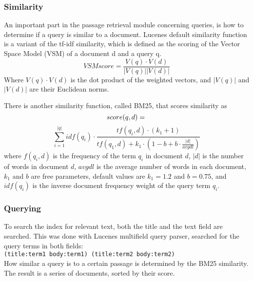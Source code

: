 \subsubsection{Similarity}
An important part in the passage retrieval module concerning queries, is how to determine if a query is similar to a document.
Lucenes default similarity function is a variant of the tf-idf similarity, 
which is defined as the scoring of the Vector Space Model (VSM) of a document d and a query q.
\[VSM score = \frac{V(q)\cdot V(d)}{|V(q)||V(d)|} \]
Where $V(q) \cdot V(d)$ is the dot product of the weighted vectors, and $|V(q)|$ and $|V(d)|$ are their Euclidean norms. \cite{tfidfsimilarity}

There is another similarity function, called BM25, that scores similarity as
\[
score(q,d) = \\
\]
\[
\sum_{i=1}^{|q|} idf(q_i) \cdot \frac{tf(q_i,d) \cdot (k_1 + 1)}{tf(q_1,d) + k_1 \cdot (1 - b + b \cdot \frac{|d|}{avgdl})}
\]
where $f(q_i,d)$ is the frequency of the term $q_i$ in document $d$, 
$|d|$ is the number of words in document $d$,
$avgdl$ is the average number of words in each document,
$k_1$ and $b$ are free parameters, default values are $k_1 = 1.2$ and $b = 0.75$,
and $idf(q_i)$ is the inverse document frequency weight of the query term $q_i$. \cite{bm25similarity}

\subsubsection{Querying}
To search the index for relevant text, both the title and the text field are searched. 
This was done with Lucenes multifield query parser, searched for the query terms in both fields: \\
\texttt{(title:term1 body:term1) (title:term2 body:term2)} \\
How similar a query is to a certain passage is determined by the BM25 similarity.
The result is a series of documents, sorted by their score.
